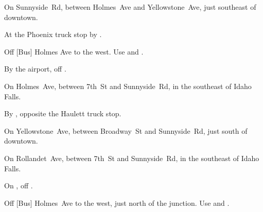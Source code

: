 
\begin{LocationList}

On Sunnyside~Rd, between Holmes~Ave and Yellowstone~Ave, just southeast of downtown.

At the Phoenix truck stop by  .

\Location{\GarageHQ \Garage \SpecialTransport}
Off [Bus] Holmes Ave to the west.
Use   and  .

By the airport, off  .

On Holmes~Ave, between 7th~St and Sunnyside~Rd, in the southeast of Idaho Falls.

By  , opposite the Haulett truck stop.

On Yellowstone~Ave, between Broadway~St and Sunnyside~Rd, just south of downtown.

On Rollandet~Ave, between 7th~St and Sunnyside~Rd, in the southeast of Idaho Falls.

\Location{\RecruitmentAgency \Recruitment}
On , off  .


Off [Bus] Holmes~Ave to the west, just north of the  junction.
Use   and  .

\end{LocationList}
